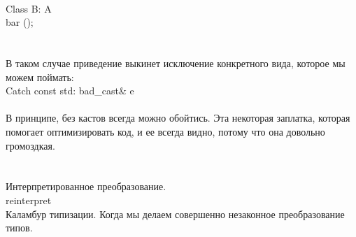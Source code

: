 \documentclass[a4paper,10pt]{article}
\begin{document}
\\Class B: A {
\\bar ();
\\}
\\

\\В таком случае приведение выкинет исключение конкретного вида, которое мы можем поймать:
\\Catch {const std: bad_cast& e}
\\

\\В принципе, без кастов всегда можно обойтись. Эта некоторая заплатка, которая помогает оптимизировать код, и ее всегда видно, потому что она довольно громоздкая.
\\
\\

\\Интерпретированное преобразование.
\\reinterpret
\\Каламбур типизации. Когда мы делаем совершенно незаконное преобразование типов. 
\end{document}
